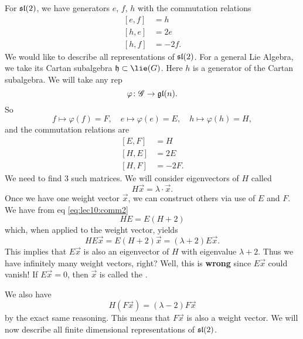 For $\frak{sl}(2)$, we have generators $e$, $f$, $h$ with the
commutation relations
\begin{subequations}
\begin{align}
[e,f]&=h\\
[h,e]&=2e\\
[h,f]&=-2f.
\end{align}
\end{subequations}
We would like to describe all representations of
$\frak{sl}(2)$. For a general Lie Algebra, we take its Cartan
subalgebra $\frak{h}\subset\lie(G)$. Here $h$ is a generator of
the Cartan subalgebra. We will take any rep
\begin{equation}
\varphi\colon\mathscr{G}\to\frak{gl}(n).
\end{equation}
So
\begin{equation}
f\mapsto\varphi(f)=F,\quad
e\mapsto\varphi(e)=E,\quad
h\mapsto\varphi(h)=H,
\end{equation}
and the commutation relations are
\begin{subequations}
\begin{align}
[E,F]&=H\label{eq:lec10:comm1}\\
[H,E]&=2E\label{eq:lec10:comm2} \\
[H,F]&=-2F.\label{eq:lec10:comm3}
\end{align}
\end{subequations}
We need to find 3 such matrices. We will consider eigenvectors of
$H$ called 
\begin{equation}
H\vec{x}=\lambda\cdot\vec{x}.
\end{equation}
Once we have one weight vector $\vec{x}$, we can construct others
via use of $E$ and $F$. We have from eq \eqref{eq:lec10:comm2}
\begin{equation}
HE=E(H+2)
\end{equation}
which, when applied to the weight vector, yields
\begin{equation}
HE\vec{x}=E(H+2)\vec{x}=(\lambda+2)E\vec{x}.
\end{equation}
This implies that $E\vec{x}$ is also an eigenvector of $H$ with
eigenvalue $\lambda+2$. Thus we have infinitely many weight
vectors, right? Well, this is {\bf wrong} since $E\vec{x}$ could
vanish! If $E\vec{x}=0$, then $\vec{x}$ is called the
.

We also have
\begin{equation}
H(F\vec{x})=(\lambda-2)F\vec{x}
\end{equation}
by the exact same reasoning. This means that $F\vec{x}$ is also a
weight vector. We will now describe all finite dimensional
representations of $\frak{sl}(2)$.

